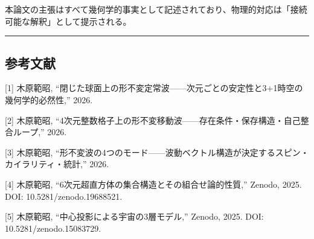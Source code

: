 \documentclass[
  a4paper,11pt]{ltjsarticle}
\theoremstyle{definition}
\theoremstyle{remark}
\begin{document}
本論文の主張はすべて幾何学的事実として記述されており、物理的対応は「接続可能な解釈」として提示される。

\begin{center}\rule{0.5\linewidth}{0.5pt}\end{center}

\subsection{参考文献}\label{ux53c2ux8003ux6587ux732e}

{[}1{]} 木原範昭,
``閉じた球面上の形不変定常波------次元ごとの安定性と3+1時空の幾何学的必然性,''
2026.

{[}2{]} 木原範昭,
``4次元整数格子上の形不変移動波------存在条件・保存構造・自己整合ループ,''
2026.

{[}3{]} 木原範昭,
``形不変波の4つのモード------波動ベクトル構造が決定するスピン・カイラリティ・統計,''
2026.

{[}4{]} 木原範昭, ``6次元超直方体の集合構造とその組合せ論的性質,''
Zenodo, 2025. DOI: 10.5281/zenodo.19688521.

{[}5{]} 木原範昭, ``中心投影による宇宙の3層モデル,'' Zenodo, 2025. DOI:
10.5281/zenodo.15083729.
\end{document}
